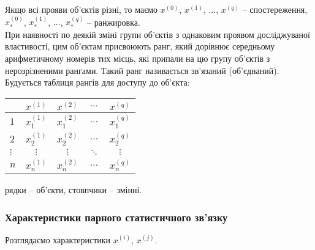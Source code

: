 Якщо всі прояви об'єктів різні, то маємо $x^{(0)}$, $x^{(1)}$, $\ldots$, $x^{(q)}$ -- спостереження, $x_*^{(0)}$, $x_*^{(1)}$, $\ldots$, $x_*^{(q)}$ -- ранжировка. \\

При наявності по деякій зміні групи об'єктів з однаковим проявом досліджуваної властивості, цим об'єктам присвоюють ранг, який дорівнює середньому арифметичному номерів тих місць, які припали на цю групу об'єктів з нерозрізненими рангами. Такий ранг називається зв'язаний (об'єднаний). \\

Будується таблиця рангів для доступу до об'єкта:
\begin{table}[H]
	\centering
	\begin{tabular}{|l|c|c|c|c|}
		\hline
		 & $x^{(1)}$ & $x^{(2)}$ & $\ldots$ & $x^{(q)}$ \\
 \hline
		$1$ & $x_1^{(1)}$ & $x_1^{(2)}$ & $\ldots$ & $x_1^{(q)}$ \\
 \hline
		$2$ & $x_2^{(1)}$ & $x_2^{(2)}$ & $\ldots$ & $x_2^{(q)}$ \\
 \hline
		$\vdots$ & $\vdots$ & $\vdots$ & $\ddots$ & $\vdots$ \\
 \hline
		$n$ & $x_n^{(1)}$ & $x_n^{(2)}$ & $\ldots$ & $x_n^{(q)}$ \\
 \hline
	\end{tabular}
\end{table}
рядки -- об'єкти, стовпчики -- змінні.
\subsubsection{Характеристики парного статистичного зв'язку}
Розглядаємо характеристики $x^{(i)}$, $x^{(j)}$. \\

